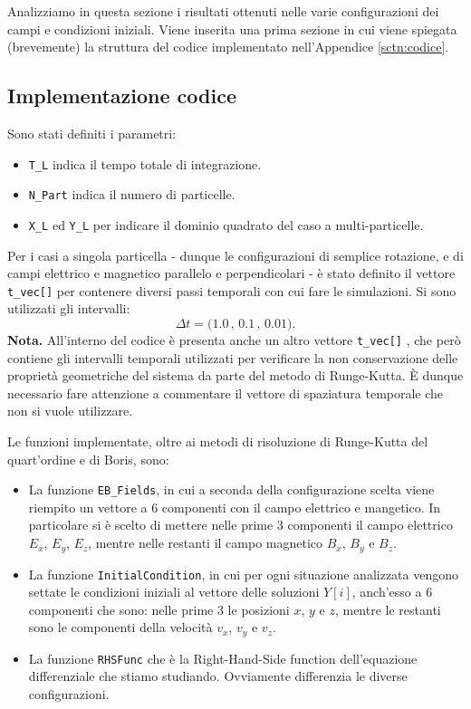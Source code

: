 \documentclass[10pt,a4paper]{article}
\begin{document}
Analizziamo in questa sezione i risultati ottenuti nelle varie configurazioni dei campi e condizioni iniziali. Viene inserita una prima sezione in cui viene spiegata (brevemente) la struttura del codice implementato nell'Appendice \ref{sctn:codice}.


\subsection{Implementazione codice}

Sono stati definiti i parametri:
\begin{itemize}
    \item \texttt{T\_L} indica il tempo totale di integrazione.
    \item \texttt{N\_Part} indica il numero di particelle.
    \item \texttt{X\_L} ed \texttt{Y\_L} per indicare il dominio quadrato del caso a multi-particelle.
\end{itemize}

Per i casi a singola particella - dunque le configurazioni di semplice rotazione, e di campi elettrico e magnetico parallelo e perpendicolari - è stato definito il vettore \texttt{t\_vec[]} per contenere diversi passi temporali con cui fare le simulazioni. Si sono utilizzati gli intervalli:
\begin{equation*}
    \Delta t = \big( 1.0\, , \, 0.1\, , \, 0.01 \big).
    \label{eqn:1 intervalli temporali per single particle}
\end{equation*}
\textbf{Nota.} All'interno del codice è presenta anche un altro vettore \texttt{t\_vec[]} , che però contiene gli intervalli temporali utilizzati per verificare la non conservazione delle proprietà geometriche del sistema da parte del metodo di Runge-Kutta. È dunque necessario fare attenzione a commentare il vettore di spaziatura temporale che non si vuole utilizzare.

Le funzioni implementate, oltre ai metodi di risoluzione di Runge-Kutta del quart'ordine e di Boris, sono:
\begin{itemize}
    \item La funzione \texttt{EB\_Fields}, in cui a seconda della configurazione scelta viene riempito un vettore a 6 componenti con il campo elettrico e mangetico. In particolare si è scelto di mettere nelle prime 3 componenti il campo elettrico $E_x$, $E_y$, $E_z$, mentre nelle restanti il campo magnetico $B_x$, $B_y$ e $B_z$.
    \item La funzione \texttt{InitialCondition}, in cui per ogni situazione analizzata vengono settate le condizioni iniziali al vettore delle soluzioni $Y[i]$, anch'esso a 6 componenti che sono: nelle prime 3 le posizioni $x$, $y$ e $z$, mentre le restanti sono le componenti della velocità $v_x$, $v_y$ e $v_z$.
    \item La funzione \texttt{RHSFunc} che è la Right-Hand-Side function dell'equazione differenziale che stiamo studiando. Ovviamente differenzia le diverse configurazioni.
\end{itemize}
\end{document}
